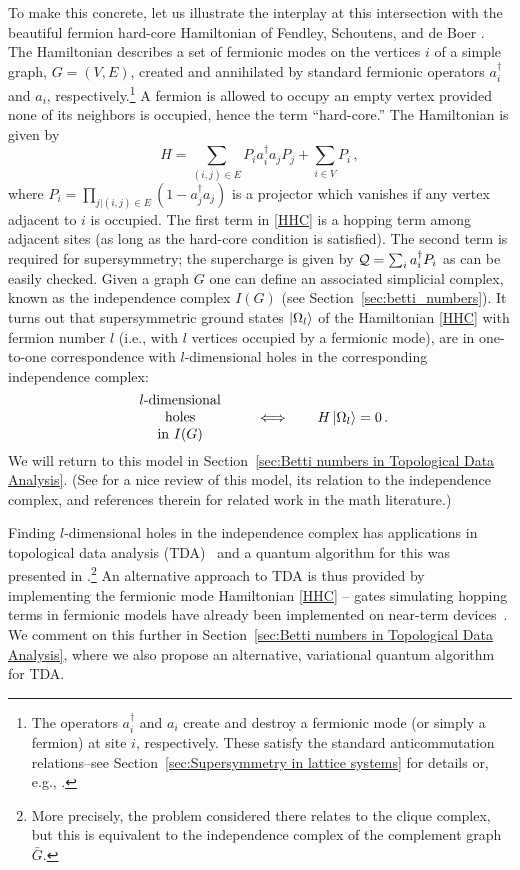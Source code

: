 \documentclass[11pt]{article}
\numberwithin{equation}{section}
\def\cQ{{\cal Q}}
\newcommand\equ[1] {\begin{equation}#1\end{equation}}
\newcommand\eqs[1] {\begin{align}#1\end{align}}
\renewcommand\( {\left(}
\renewcommand\) {\right)}
\begin{document}
To make this concrete, let us illustrate the interplay at this intersection with the beautiful fermion hard-core Hamiltonian  of  Fendley,  Schoutens, and  de Boer \cite{Fendley:2002sg}. The Hamiltonian describes a set of fermionic modes on the vertices $i$ of a simple graph, $G=(V,E)$, created and annihilated by standard fermionic operators $a_i^\dagger$ and $a_i$, respectively.\footnote{The operators $a_i^\dagger$ and $a_i$ create and destroy a fermionic mode (or simply a fermion) at site $i$, respectively. These satisfy the standard anticommutation relations--see Section~\ref{sec:Supersymmetry in lattice systems} for details or, e.g., \cite{bravyi2002fermionic}.}  A fermion is allowed to occupy an empty vertex provided none of its neighbors is occupied, hence the term ``hard-core.'' The Hamiltonian is given by
\equ{\label{HHC}
H=\sum_{ (i,j)\in E} P_i a_i^\dagger a_j P_j+\sum_{i\in V}P_i\,,
}
where $P_i=\prod_{j|(i,j)\in E} (1-a_j^\dagger a_j)$ is a projector which vanishes if any vertex adjacent  to $i$ is occupied. The first term in \eqref{HHC} is a hopping term among adjacent sites (as long as the hard-core condition is satisfied). The second term is required for supersymmetry; the supercharge is given by $\cQ=\sum_i a_i^\dagger P_i$ as can be easily checked. Given a graph $G$ one can define an associated simplicial complex, known as the independence complex $I(G)$ (see Section~\ref{sec:betti_numbers}). It turns out that supersymmetric ground states $\ket{\Omega_l}$ of the Hamiltonian \eqref{HHC}  with fermion number $l$ (i.e., with $l$ vertices occupied by a fermionic mode), are  in one-to-one correspondence with $l$-dimensional holes in the corresponding independence complex:
\eqs{
\parbox{0.2\textwidth}{\centering $l$-dimensional holes \\ in $I(G)$ } \qquad \Longleftrightarrow \qquad H\ket{\Omega_l}=0\,.
}
We will return to this model in Section~\ref{sec:Betti numbers in Topological Data Analysis}. (See \cite{huijse2009supersymmetry} for a nice review of this model, its relation to the independence complex, and references therein for related work in the math literature.) 

Finding $l$-dimensional holes in the independence complex has applications in topological data analysis (TDA)~\cite{wasserman2018topological} and a quantum algorithm for this was presented in  \cite{LloydetalTDA}.\footnote{More precisely, the problem considered there relates to the clique complex, but this is equivalent to the independence complex of the complement graph $\bar G$.} An alternative approach to TDA is thus provided by implementing the fermionic mode Hamiltonian \eqref{HHC} -- gates simulating hopping terms in fermionic models have already been implemented on near-term devices~\cite{Foxen_2020}. We comment on this further in Section~\ref{sec:Betti numbers in Topological Data Analysis}, where we also propose an alternative, variational quantum algorithm for TDA.
\end{document}
